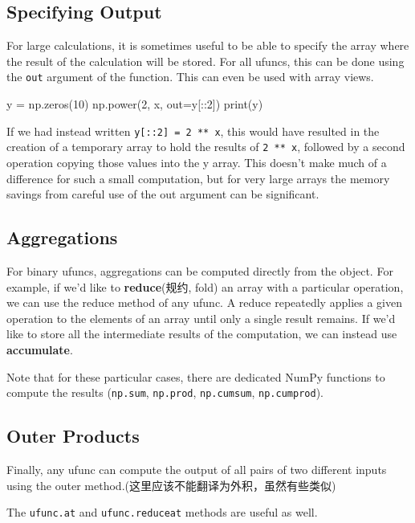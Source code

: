 \subsection*{Specifying Output}
For large calculations, it is sometimes useful to be able to specify the array where the result of the calculation will be stored. For all ufuncs, this can be done using the \verb|out| argument of the function. This can even be used with array views.

\begin{pyc}
    y = np.zeros(10)
    np.power(2, x, out=y[::2])
    print(y)
\end{pyc}

If we had instead written \verb|y[::2] = 2 ** x|, this would have resulted in the creation
of a temporary array to hold the results of \verb|2 ** x|, followed by a second operation
copying those values into the y array. This doesn't make much of a difference for such
a small computation, but for very large arrays the memory savings from careful use of
the out argument can be significant.
\subsection*{Aggregations}

For binary ufuncs, aggregations can be computed directly from the object. For example, if we'd like to \textbf{reduce}(规约, fold) an array with a particular operation, we can use the reduce
method of any ufunc. A reduce repeatedly applies a given operation to the elements
of an array until only a single result remains. If we'd like to store all the intermediate results of the computation, we can instead use
\textbf{accumulate}.

Note that for these particular cases, there are dedicated NumPy functions to compute
the results (\verb|np.sum|, \verb|np.prod|, \verb|np.cumsum|, \verb|np.cumprod|).

\subsection*{Outer Products}
Finally, any ufunc can compute the output of all pairs of two different inputs using
the outer method.(这里应该不能翻译为外积，虽然有些类似)

The \verb|ufunc.at| and \verb|ufunc.reduceat| methods are useful as well.